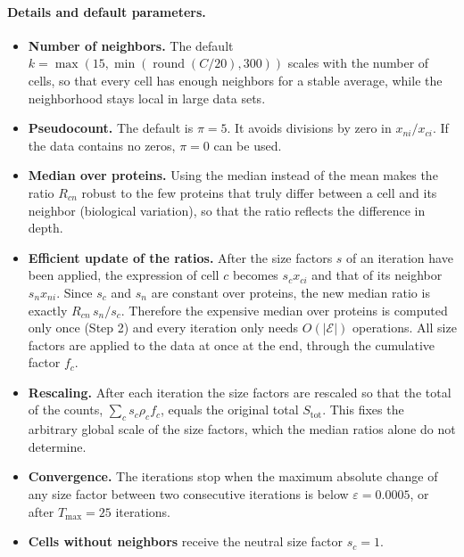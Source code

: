 \documentclass[11pt]{article}
\begin{document}
\paragraph{Details and default parameters.}
\begin{itemize}
  \item \textbf{Number of neighbors.} The default $k = \max(15, \min(\operatorname{round}(C/20), 300))$
    scales with the number of cells, so that every cell has enough neighbors
    for a stable average, while the neighborhood stays local in large data sets.
  \item \textbf{Pseudocount.} The default is $\pi = 5$. It avoids divisions by
    zero in $x_{ni}/x_{ci}$. If the data contains no zeros, $\pi = 0$ can be used.
  \item \textbf{Median over proteins.} Using the median instead of the mean
    makes the ratio $R_{cn}$ robust to the few proteins that truly differ
    between a cell and its neighbor (biological variation), so that the ratio
    reflects the difference in depth.
  \item \textbf{Efficient update of the ratios.} After the size factors $s$ of an
    iteration have been applied, the expression of cell $c$ becomes $s_c x_{ci}$
    and that of its neighbor $s_n x_{ni}$. Since $s_c$ and $s_n$ are constant over
    proteins, the new median ratio is exactly $R_{cn}\, s_n / s_c$. Therefore the
    expensive median over proteins is computed only once (Step 2) and every
    iteration only needs $O(|\mathcal{E}|)$ operations. All size factors are
    applied to the data at once at the end, through the cumulative factor $f_c$.
  \item \textbf{Rescaling.} After each iteration the size factors are rescaled so
    that the total of the counts, $\sum_c s_c \rho_c f_c$, equals the original
    total $S_{\text{tot}}$. This fixes the arbitrary global scale of the size
    factors, which the median ratios alone do not determine.
  \item \textbf{Convergence.} The iterations stop when the maximum absolute
    change of any size factor between two consecutive iterations is below
    $\varepsilon = 0.0005$, or after $T_{\max} = 25$ iterations.
  \item \textbf{Cells without neighbors} receive the neutral size factor
    $s_c = 1$.
\end{itemize}
\end{document}
